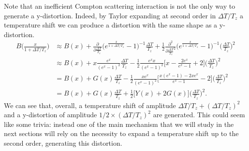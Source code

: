Note that an inefficient Compton scattering interaction is not the only way to generate a y-distortion. Indeed, by Taylor expanding at second order in $\Delta T/T_z$ a temperature shift we can produce a distortion with the same shape as a y-distortion.
\begin{align}
    \nonumber B\bigg(\frac{x}{1+\Delta T/T_z}\bigg)&\approx B(x)+\frac{\partial}{\partial \frac{\Delta T}{T_z}}\bigg(e^{\frac{x}{1+\Delta T/T_z}}-1\bigg)^{-1}\frac{\Delta T}{T_z}+\frac{1}{2}\frac{\partial^2}{\partial \frac{\Delta T}{T_z}^2}\bigg(e^{\frac{x}{1+\Delta T/T_z}}-1\bigg)^{-1}\bigg(\frac{\Delta T}{T_z}\bigg)^2\\&\nonumber\approx B(x)+x\frac{e^x}{(e^x-1)^2}\frac{\Delta T}{T_z}-\frac{1}{2}\frac{e^xx}{(e^x-1)^2}\bigg[x-\frac{2e^{x}}{e^x-1}+2\bigg]\bigg(\frac{\Delta T}{T_z}\bigg)^2\\ \nonumber&= B(x)+G(x)\frac{\Delta T}{T_z}-\frac{1}{2}\frac{xe^x}{(e^x-1)^2}\bigg[\frac{x(e^x-1)-2xe^x}{e^x-1}-2\bigg]\bigg(\frac{\Delta T}{T_z}\bigg)^2\\&=B(x)+G(x)\frac{\Delta T}{T_z}+\frac{1}{2}\big[Y(x)+2G(x)\big]\bigg(\frac{\Delta T}{T_z}\bigg)^2.\label{eq:SD_2ord_temp_shift}
\end{align}
We can see that, overall, a temperature shift of amplitude $\Delta T/T_z+(\Delta T/T_z)^2$ and a y-distortion of amplitude $1/2\times(\Delta T/T_z)^2$ are generated. This could seem like some trivia: instead one of the main mechanism that we will study in the next sections will rely on the necessity to expand a temperature shift up to the second order, generating this distortion.
